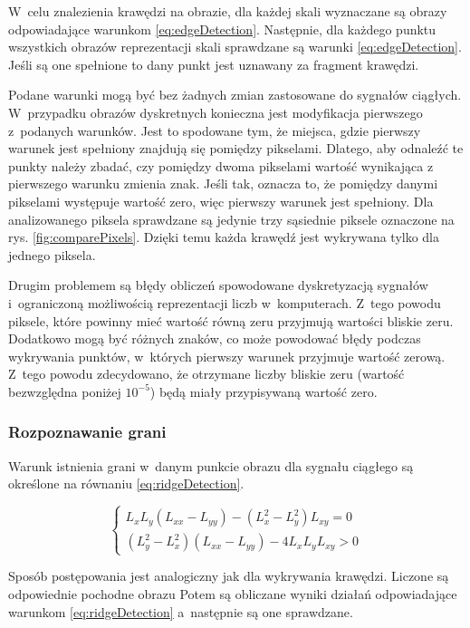 W~celu znalezienia krawędzi na obrazie, dla każdej skali wyznaczane są obrazy odpowiadające warunkom \ref{eq:edgeDetection}. Następnie, dla każdego punktu wszystkich obrazów reprezentacji skali sprawdzane są warunki \ref{eq:edgeDetection}. Jeśli są one spełnione to dany punkt jest uznawany za fragment krawędzi.

Podane warunki mogą być bez żadnych zmian zastosowane do sygnałów ciągłych. W~przypadku obrazów dyskretnych konieczna jest modyfikacja pierwszego z~podanych warunków. Jest to spodowane tym, że miejsca, gdzie pierwszy warunek jest spełniony znajdują się pomiędzy pikselami. Dlatego, aby odnaleźć te punkty należy zbadać, czy pomiędzy dwoma pikselami wartość wynikająca z pierwszego warunku zmienia znak. Jeśli tak, oznacza to, że pomiędzy danymi pikselami występuje wartość zero, więc pierwszy warunek jest spełniony. Dla analizowanego piksela sprawdzane są jedynie trzy sąsiednie piksele oznaczone na rys. \ref{fig:comparePixels}. Dzięki temu każda krawędź jest wykrywana tylko dla jednego piksela.

Drugim problemem są błędy obliczeń spowodowane dyskretyzacją sygnałów i~ograniczoną możliwością reprezentacji liczb w~komputerach. Z~tego powodu piksele, które powinny mieć wartość równą zeru przyjmują wartości bliskie zeru. Dodatkowo mogą być różnych znaków, co może powodować błędy podczas wykrywania punktów, w~których pierwszy warunek przyjmuje wartość zerową. Z~tego powodu zdecydowano, że otrzymane liczby bliskie zeru (wartość bezwzględna poniżej $ 10^{-5} $) będą miały przypisywaną wartość zero.


\subsubsection{Rozpoznawanie grani}
\label{subsubsec:rozpoznawanieGrani}

Warunk istnienia grani w~danym punkcie obrazu dla sygnału ciągłego są określone na równaniu \ref{eq:ridgeDetection}.

\begin{equation}
\label{eq:ridgeDetection}
\left\{ \begin{array}{rl}
L_xL_y(L_{xx}-L_{yy}) - (L_x^2 - L_y^2)L_{xy} = 0 \\
(L_y^2 - L_x^2)(L_{xx} - L_{yy}) - 4 L_xL_yL_{xy} > 0
\end{array} \right.
\end{equation}

Sposób postępowania jest analogiczny jak dla wykrywania krawędzi. Liczone są odpowiednie pochodne obrazu
Potem są obliczane wyniki działań odpowiadające warunkom \ref{eq:ridgeDetection} a~następnie są one sprawdzane.


